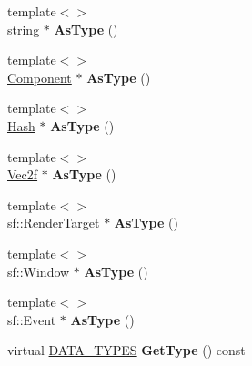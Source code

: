 \begin{DoxyCompactItemize}
\item 
\hypertarget{class_k_g_e_1_1_data_a0df677588b351f1faf12d28be6179f51}{{\footnotesize template$<$$>$ }\\string $\ast$ {\bfseries As\-Type} ()}\label{class_k_g_e_1_1_data_a0df677588b351f1faf12d28be6179f51}

\item 
\hypertarget{class_k_g_e_1_1_data_ae4b311a61df702ba64e9af9d9a1f9d09}{{\footnotesize template$<$$>$ }\\\hyperlink{class_k_g_e_1_1_component}{Component} $\ast$ {\bfseries As\-Type} ()}\label{class_k_g_e_1_1_data_ae4b311a61df702ba64e9af9d9a1f9d09}

\item 
\hypertarget{class_k_g_e_1_1_data_a20d87bed9791473bdec7bdf5f46cff47}{{\footnotesize template$<$$>$ }\\\hyperlink{class_k_g_e_1_1_hash}{Hash} $\ast$ {\bfseries As\-Type} ()}\label{class_k_g_e_1_1_data_a20d87bed9791473bdec7bdf5f46cff47}

\item 
\hypertarget{class_k_g_e_1_1_data_ae30d13c2899a40892fd22bd3646e8dd6}{{\footnotesize template$<$$>$ }\\\hyperlink{struct_k_g_e_1_1_vec2f}{Vec2f} $\ast$ {\bfseries As\-Type} ()}\label{class_k_g_e_1_1_data_ae30d13c2899a40892fd22bd3646e8dd6}

\item 
\hypertarget{class_k_g_e_1_1_data_a919532108aa4b35f536e9fe64fe90f15}{{\footnotesize template$<$$>$ }\\sf\-::\-Render\-Target $\ast$ {\bfseries As\-Type} ()}\label{class_k_g_e_1_1_data_a919532108aa4b35f536e9fe64fe90f15}

\item 
\hypertarget{class_k_g_e_1_1_data_a78a699ce8e5f10b699621fe57024683c}{{\footnotesize template$<$$>$ }\\sf\-::\-Window $\ast$ {\bfseries As\-Type} ()}\label{class_k_g_e_1_1_data_a78a699ce8e5f10b699621fe57024683c}

\item 
\hypertarget{class_k_g_e_1_1_data_a83804415d4aa5d20e98aa6cd1986b111}{{\footnotesize template$<$$>$ }\\sf\-::\-Event $\ast$ {\bfseries As\-Type} ()}\label{class_k_g_e_1_1_data_a83804415d4aa5d20e98aa6cd1986b111}

\item 
\hypertarget{class_k_g_e_1_1_data_a8a82c58b3228fde51e059080a8bf5df7}{virtual \hyperlink{class_k_g_e_1_1_data_acc872a3e856e6d9b554d36d9f534308f}{D\-A\-T\-A\-\_\-\-T\-Y\-P\-E\-S} {\bfseries Get\-Type} () const }\label{class_k_g_e_1_1_data_a8a82c58b3228fde51e059080a8bf5df7}


\end{DoxyCompactItemize}
